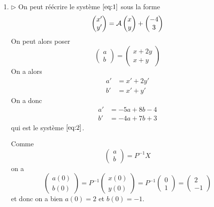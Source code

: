 {\begin{nntd-sol}[]
\begin{enumerate}
			\item \(\triangleright\) On peut réécrire le système \(\eqref{eq:1}\) sous la forme
			\begin{equation*}
				\begin{pmatrix}
					x'\\
					y'
				\end{pmatrix}
				=\cal A
				\begin{pmatrix}
					x\\
					y
				\end{pmatrix}
				+\begin{pmatrix}
					-4\\
					3
				\end{pmatrix}
			\end{equation*}
			On peut alors poser
			\begin{equation*}
				\begin{pmatrix}
					a\\
					b
				\end{pmatrix}
				=\begin{pmatrix}
					x+2y\\
					x+y
				\end{pmatrix}
			\end{equation*}
			On a alors
			\begin{equation*}
				\begin{aligned}
					a'&=x'+2y'\\
					b'&=x'+y'
				\end{aligned}
			\end{equation*}
			On a donc
			\begin{equation*}
				\begin{aligned}
					a'&=-5a+8b-4\\
					b'&=-4a+7b+3
				\end{aligned}
			\end{equation*}
			qui est le système \(\eqref{eq:2}\).

			Comme 
			\begin{equation*}
				\begin{pmatrix}
					a\\
					b
				\end{pmatrix}
				=P^{-1}X
			\end{equation*}
			on a
			\begin{equation*}
				\begin{pmatrix}
					a(0)\\
					b(0)
				\end{pmatrix}
				=P^{-1}
				\begin{pmatrix}
					x(0)\\
					y(0)
				\end{pmatrix}
				=P^{-1}
				\begin{pmatrix}
					0\\
					1
				\end{pmatrix}
				=
				\begin{pmatrix}
					2\\
					-1
				\end{pmatrix}
			\end{equation*}
			et donc on a bien \(a(0)=2\) et \(b(0)=-1\).


\end{enumerate}
\end{nntd-sol}}
